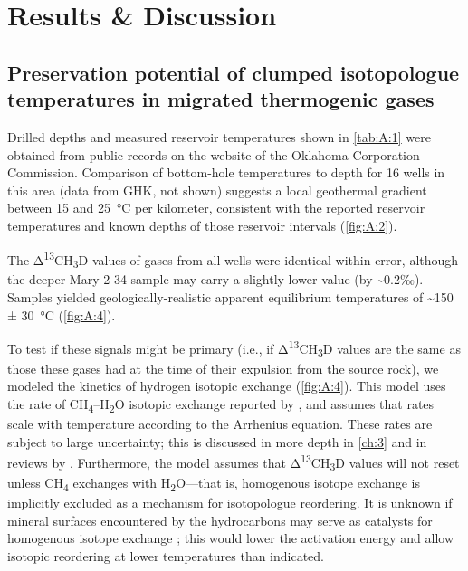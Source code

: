 \section{Results \& Discussion}\label{results-discussion}

\subsection{Preservation potential of clumped isotopologue
	temperatures in migrated thermogenic
	gases}\label{preservation-potential-of-clumped-isotopologue-temperatures-in-migrated-thermogenic-gases}



Drilled depths and measured reservoir temperatures shown in \autoref{tab:A:1} were
obtained from public records on the website of the Oklahoma Corporation
Commission. Comparison of bottom-hole temperatures to depth for 16 wells
in this area (data from GHK, not shown) suggests a local geothermal
gradient between 15 and 25~°C per kilometer, consistent with the
reported reservoir temperatures and known depths of those reservoir
intervals (\autoref{fig:A:2}).

The Δ\textsuperscript{13}CH\textsubscript{3}D values of gases from all
wells were identical within error, although the deeper Mary 2-34 sample
may carry a slightly lower value (by \textasciitilde{}0.2‰). Samples
yielded geologically-realistic apparent equilibrium temperatures of
\textasciitilde{}150 ± 30~°C (\autoref{fig:A:4}).

To test if these signals might be primary (i.e., if
Δ\textsuperscript{13}CH\textsubscript{3}D values are the same as those
these gases had at the time of their expulsion from the source rock), we
modeled the kinetics of hydrogen isotopic exchange (\autoref{fig:A:4}). This model
uses the rate of CH\textsubscript{4}--H\textsubscript{2}O isotopic
exchange reported by \textcite{Koepp_1978}, and assumes that rates scale with
temperature according to the Arrhenius equation. These rates are subject
to large uncertainty; this is discussed in more depth in \autoref{ch:3} and
in reviews by \textcite{Schimmelmann++_2006_AREarth,Sessions++_2004_GCA}.
Furthermore, the model assumes that
Δ\textsuperscript{13}CH\textsubscript{3}D values will not reset unless
CH\textsubscript{4} exchanges with H\textsubscript{2}O---that is,
homogenous isotope exchange is implicitly excluded as a mechanism for
isotopologue reordering. It is unknown if mineral surfaces encountered
by the hydrocarbons may serve as catalysts for homogenous isotope
exchange \parencite{Shipp++_2014_PNAS}; this would lower the activation energy
and allow isotopic reordering at lower temperatures than indicated.

